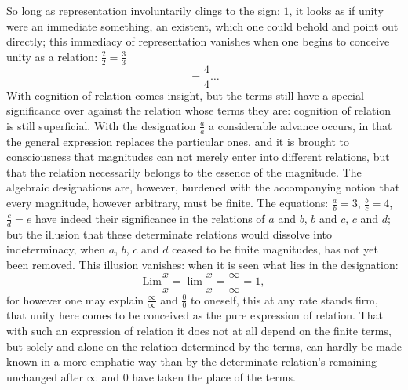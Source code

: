 \documentclass[12pt,a4paper,openany]{book}
\newcommand{\opage}[1]{\marginnote{\footnotesize\textit{[#1]}}}
\begin{document}
\setcounter{footnote}{0}%
\opage{79}So long as representation involuntarily clings to the sign: $1$, it looks as if unity were an immediate
something, an existent, which one could behold and point out directly;
this immediacy of representation vanishes when
one begins to conceive unity as a relation: $\frac{2}{2}=\frac{3}{3}$
\[ =\frac{4}{4}\ldots \]
With cognition of relation comes
insight, but
the terms still have a special significance over against the
relation whose terms they are: cognition of relation is still
superficial. With the designation $\frac{a}{a}$ a considerable advance occurs,
in that the general expression replaces the particular ones,
and it is brought to consciousness that magnitudes can not merely
enter into different relations, but that the relation necessarily
belongs to the essence of the magnitude. The algebraic
designations are, however, burdened with the accompanying notion
that every magnitude, however arbitrary, must be finite.
The equations: $\frac{a}{b}=3$, $\frac{b}{c}=4$, $\frac{c}{d}=e$ have indeed their
significance in the relations of $a$ and $b$, $b$ and $c$, $c$ and $d$; but
the illusion that these determinate relations would dissolve
into indeterminacy, when $a$, $b$, $c$ and $d$ ceased to be finite
magnitudes, has not yet been removed. This illusion vanishes:
when it is seen what lies in the designation:
\[ \mathrm{Lim}\frac{x}{x}=\lim\frac{x}{x}=\frac{\infty}{\infty}=1, \]
for however one may explain $\frac{\infty}{\infty}$ and $\frac{0}{0}$ to oneself, this at any rate stands firm, that unity here comes to be
conceived as the pure expression of relation. That with such an expression of relation it does not at all depend on the finite
terms, but solely and alone on the relation determined by the terms,
can hardly be made known in a more emphatic
way than by the determinate relation's remaining
unchanged after $\infty$ and $0$ have taken the place of the terms.
\end{document}
